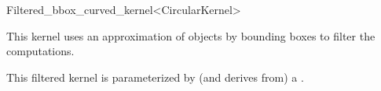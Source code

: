 \begin{ccRefClass}{Filtered_bbox_curved_kernel<CircularKernel>}

\ccDefinition

This kernel uses an approximation of objects by bounding boxes to filter the 
computations. 


\ccIsModel


\ccParameters

This filtered kernel is parameterized by (and derives from) a . 

\end{ccRefClass}

